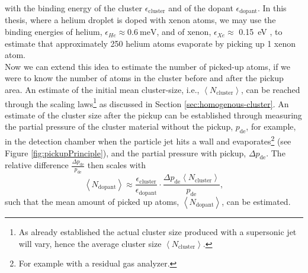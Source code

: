 with the binding energy of the cluster $\epsilon_{\text{cluster}}$ and of the dopant $\epsilon_{\text{dopant}}$. In this thesis, where a helium droplet is doped with xenon atoms, we may use the binding energies of helium, $\epsilon_{He}\approx \SI{0.6}{\milli\electronvolt}$, and of xenon, $\epsilon_{Xe}\approx$ \SI{0.15}{\electronvolt} \citep{Gomez-2011-JCP,Gomez-2014-Science}, to estimate that approximately 250 helium atoms evaporate by picking up 1 xenon atom.\\[1\baselineskip]
%
Now we can extend this idea to estimate the number of picked-up atoms, if we were to know the number of atoms in the cluster before and after the pickup area. An estimate of the initial mean cluster-size, i.e., $\left\langle N_{\text{cluster}}\right\rangle$, can be reached through the scaling laws\footnote{As already established the actual cluster size produced with a supersonic jet will vary, hence the average cluster size $\left\langle N_{\text{cluster}}\right\rangle$.} as discussed in Section \ref{sec:homogenous-cluster}. An estimate of the cluster size after the pickup can be established through measuring the partial pressure of the cluster material without the pickup, $p_{\text{de}}$, for example, in the detection chamber when the particle jet hits a wall and evaporates\footnote{For example with a residual gas analyzer.} (see Figure \ref{fig:pickupPrinciple}), and the partial pressure with pickup, $\Delta p_{\text{de}}$. The relative difference $\tfrac{\Delta p_{\text{de}}}{p_{\text{de}}}$ then scales with
\begin{equation}
\left\langle N_{\text{dopant}}\right\rangle \approx \frac{\epsilon_{\text{cluster}}}{\epsilon_{\text{dopant}}} \cdot \frac{\Delta p_{\text{de}} \left\langle N_{\text{cluster}}\right\rangle}{p_{\text{de}}},
\label{eq:average-dopant}
\end{equation}
such that the mean amount of picked up atoms, $\left\langle N_{\text{dopant}}\right\rangle$, can be estimated.
%
